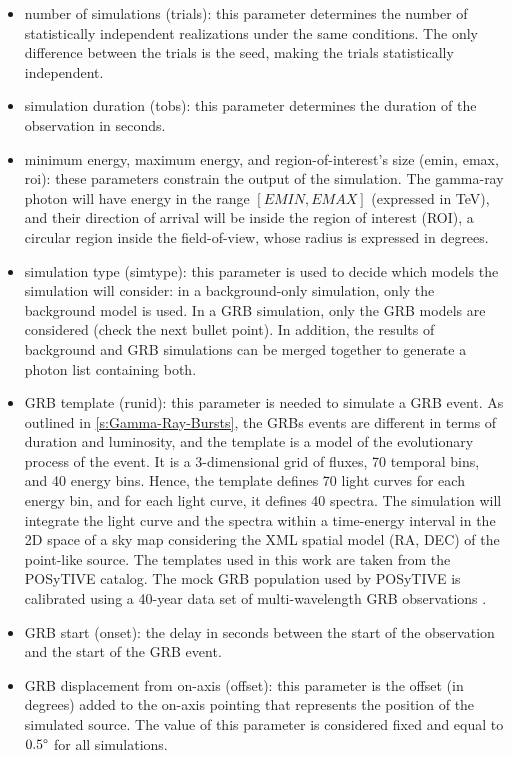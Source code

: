 \begin{itemize}
    \item number of simulations (trials): this parameter determines the number of statistically independent realizations under the same conditions. The only difference between the trials is the seed, making the trials statistically independent.
    \item simulation duration (tobs): this parameter determines the duration of the observation in seconds.
    \item minimum energy, maximum energy, and region-of-interest's size (emin, emax, roi): these parameters constrain the output of the simulation. The gamma-ray photon will have energy in the range $[EMIN, EMAX]$ (expressed in TeV), and their direction of arrival will be inside the region of interest (ROI), a circular region inside the field-of-view, whose radius is expressed in degrees.
    \item simulation type (simtype): this parameter is used to decide which models the simulation will consider: in a background-only simulation, only the background model is used. In a GRB simulation, only the GRB models are considered (check the next bullet point). In addition, the results of background and GRB simulations can be merged together to generate a photon list containing both.  
    \item GRB template (runid): this parameter is needed to simulate a GRB event. As outlined in \autoref{s:Gamma-Ray-Bursts}, the GRBs events are different in terms of duration and luminosity, and the template is a model of the evolutionary process of the event. It is a 3-dimensional grid of fluxes, 70 temporal bins, and 40 energy bins. Hence, the template defines 70 light curves for each energy bin, and for each light curve, it defines 40 spectra. The simulation will integrate the light curve and the spectra within a time-energy interval in the 2D space of a sky map considering the XML spatial model (RA, DEC) of the point-like source. The templates used in this work are taken from the POSyTIVE catalog. The mock GRB population used by POSyTIVE is calibrated using a 40-year data set of multi-wavelength GRB observations \cite{Bernardini_2019}.
    \item GRB start (onset): the delay in seconds between the start of the observation and the start of the GRB event.
    \item GRB displacement from on-axis (offset): this parameter is the offset (in degrees) added to the on-axis pointing that represents the position of the simulated source. The value of this parameter is considered fixed and equal to $0.5\degree$ for all simulations. 

\end{itemize}
